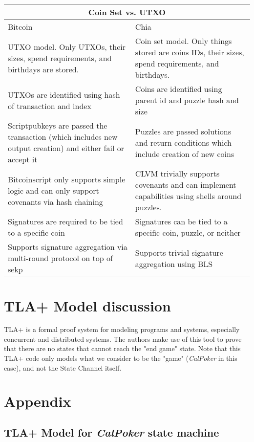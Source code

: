 \documentclass[a4paper]{article}
\begin{document}
\begin{multicols}{2}
\begin{tabular}{ |p{4cm}|p{4cm}|  }
 \hline
 \multicolumn{2}{|c|}{Coin Set vs. UTXO} \\
 \hline
 Bitcoin & Chia\\
 \hline\hline
 UTXO model. Only UTXOs, their sizes, spend requirements, and birthdays are stored. & Coin set model. Only things stored are coins IDs, their sizes, spend requirements, and birthdays.\\
 \hline
 UTXOs are identified using hash of transaction and index & Coins are identified using parent id and puzzle hash and size\\
 \hline
 Scriptpubkeys are passed the transaction (which includes new output creation) and either fail or accept it & Puzzles are passed solutions and return conditions which include creation of new coins\\
 \hline
 Bitcoinscript only supports simple logic and can only support covenants via hash chaining & CLVM trivially supports covenants and can implement capabilities using shells around puzzles.\\
 Signatures are required to be tied to a specific coin & Signatures can be tied to a specific coin, puzzle, or neither\\
 \hline
 Supports signature aggregation via multi-round protocol on top of sekp & Supports trivial signature aggregation using BLS\\
 \hline
\end{tabular}

\section{TLA+ Model discussion}

TLA+ \cite{2} is a formal proof system for modeling programs and systems, especially concurrent and distributed systems. The authors make use of this tool to prove that there are no states that cannot reach the "end game" state. Note that this TLA+ code only models what we consider to be the "game" (\textit{CalPoker} in this case), and not the State Channel itself.


\onecolumn

\section{Appendix}

\subsection{TLA+ Model for \textit{CalPoker} state machine}


\end{multicols}
\end{document}
